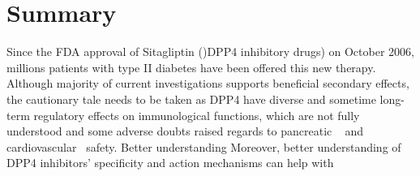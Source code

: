 \section{\label{chap:Sum} Summary}
Since the FDA approval of Sitagliptin ()DPP4 inhibitory drugs) on October 2006, millions patients with type II diabetes have been offered this new therapy. Although majority of current investigations supports beneficial secondary effects, the cautionary tale needs to be taken as DPP4 have diverse and sometime long-term regulatory effects on immunological functions, which are not fully understood and some adverse doubts raised regards to pancreatic ~\cite{Egan2014, Jermendy2016} and cardiovascular~\cite{Scirica2013} safety. Better understanding Moreover, better understanding of DPP4 inhibitors' specificity and action mechanisms can help with
